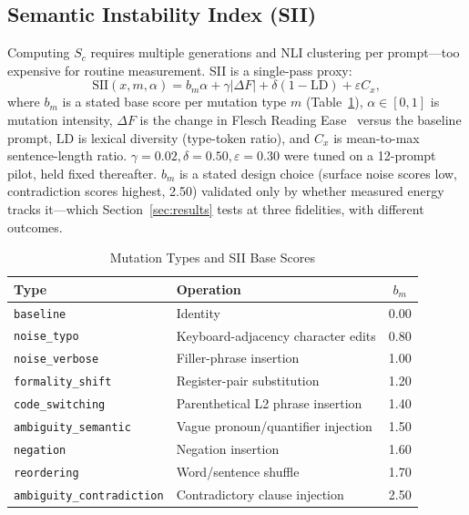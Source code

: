 \documentclass[conference]{IEEEtran}
\begin{document}
\subsection{Semantic Instability Index (SII)}
Computing $S_c$ requires multiple generations and NLI clustering per
prompt---too expensive for routine measurement. SII is a single-pass
proxy:
\begin{equation}
  \mathrm{SII}(x,m,\alpha) = b_m\alpha + \gamma|\Delta F| +
  \delta(1-\mathrm{LD}) + \varepsilon C_x,
  \label{eq:sii}
\end{equation}
where $b_m$ is a stated base score per mutation type $m$
(Table~\ref{tab:mutations}), $\alpha\in[0,1]$ is mutation intensity,
$\Delta F$ is the change in Flesch Reading
Ease~\cite{flesch1948readability} versus the baseline prompt,
$\mathrm{LD}$ is lexical diversity (type-token ratio), and $C_x$ is
mean-to-max sentence-length ratio. $\gamma=0.02,\delta=0.50,
\varepsilon=0.30$ were tuned on a 12-prompt pilot, held fixed
thereafter. $b_m$ is a stated design choice (surface noise scores low,
contradiction scores highest, 2.50) validated only by whether
measured energy tracks it---which Section~\ref{sec:results} tests at
three fidelities, with different outcomes.
\begin{table}[t]
\caption{Mutation Types and SII Base Scores}
\label{tab:mutations}
\centering
\setlength{\tabcolsep}{3.5pt}
\begin{tabular}{@{}llc@{}}
\toprule
\textbf{Type} & \textbf{Operation} & $b_m$ \\
\midrule
\texttt{baseline} & Identity & 0.00 \\
\texttt{noise\_typo} & Keyboard-adjacency character edits & 0.80 \\
\texttt{noise\_verbose} & Filler-phrase insertion & 1.00 \\
\texttt{formality\_shift} & Register-pair substitution & 1.20 \\
\texttt{code\_switching} & Parenthetical L2 phrase insertion & 1.40 \\
\texttt{ambiguity\_semantic} & Vague pronoun/quantifier injection & 1.50 \\
\texttt{negation} & Negation insertion & 1.60 \\
\texttt{reordering} & Word/sentence shuffle & 1.70 \\
\texttt{ambiguity\_contradiction} & Contradictory clause injection & 2.50 \\
\bottomrule
\end{tabular}
\end{table}
\end{document}
